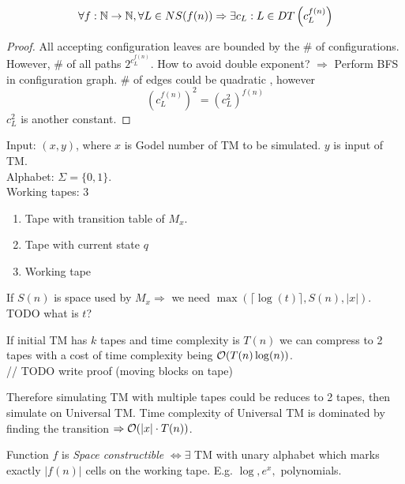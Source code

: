 \begin{theorem}
	\[\forall f:\operatorname{\mathbb{N}} \to \operatorname{\mathbb{N}}, \forall L \in NS(f(n)) \Rightarrow \exists c_L: L \in DT\left(c_L^{f(n)}\right) \]
\end{theorem}
\begin{proof}
	All accepting configuration leaves are bounded by the \# of configurations. However, \# of all paths $2^{c_L^{f(n)}}$.
	How to avoid double exponent? $\Rightarrow$ Perform BFS in configuration graph.
	\# of edges could be quadratic , however
	\[ \left(c_L^{f(n)}\right)^2 = \left(c_L^2\right)^{f(n)} \]
	$c_L^2$ is another constant.
\end{proof}

\begin{definition}[Universal TM]
Input: $(x,y)$, where $x$ is Godel number of TM to be simulated. $y$ is input of TM.\\
Alphabet: $\Sigma = \{ 0, 1 \} $.\\
Working tapes: 3
\begin{enumerate}
	\item Tape with transition table of $M_x$.
	\item Tape with current state $q$
	\item Working tape
\end{enumerate}
If $S(n)$ is space used by $M_x \Rightarrow$ we need $\max(\lceil \log(t) \rceil, S(n), |x|)$.\\
TODO what is $t$?
\end{definition}

\begin{observation}
	If initial TM has $k$ tapes and time complexity is $T(n)$ we can compress to 2 tapes with a cost of time complexity being $\mathcal{O}(T(n) \log(n))$. \\
	// TODO write proof (moving blocks on tape)

	Therefore simulating TM with multiple tapes could be reduces to 2 tapes, then simulate on Universal TM.
	Time complexity of Universal TM is dominated by finding the transition $\Rightarrow \mathcal{O}(|x| \cdot T(n))$.
\end{observation}

\begin{definition}
	Function $f$ is \emph{Space constructible} $\iff \exists$ TM with unary alphabet which marks exactly $|f(n)|$ cells on the working tape. E.g. $\log, e^x,$ polynomials.
\end{definition}

